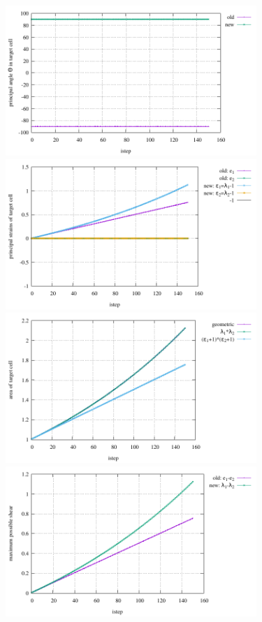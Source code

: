 \begin{center}
\includegraphics[width=9.5cm]{python_codes/fieldstone_89/results/vertical/principal_angle.pdf}
\includegraphics[width=9.5cm]{python_codes/fieldstone_89/results/vertical/principal_strains.pdf}\\
\includegraphics[width=9.5cm]{python_codes/fieldstone_89/results/vertical/area.pdf}
\includegraphics[width=9.5cm]{python_codes/fieldstone_89/results/vertical/maximum_shear.pdf}\\

\end{center}
